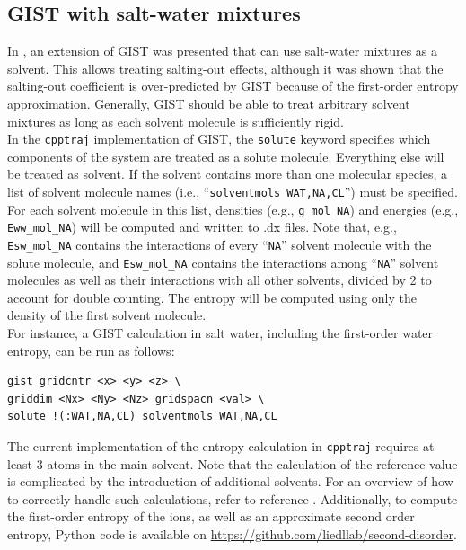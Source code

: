 \documentclass[9pt,tutorial]{livecoms}
\newcommand{\software}{\texttt}
\newcommand\inlinecode{\texttt}
\begin{document}
\subsection{GIST with salt-water mixtures}
\label{sec-salt-water}
In \cite{Waibl2021-gist-salt}, an extension of GIST was presented that can use salt-water mixtures as a solvent.
This allows treating salting-out effects, although it was shown that the salting-out coefficient is over-predicted by GIST because of the first-order entropy approximation.
Generally, GIST should be able to treat arbitrary solvent mixtures as long as each solvent molecule is sufficiently rigid. \\
In the \software{cpptraj} implementation of GIST, the \inlinecode{solute} keyword specifies which components of the system are treated as a solute molecule.
Everything else will be treated as solvent.
If the solvent contains more than one molecular species, a list of solvent molecule names (i.e., ``\inlinecode{solventmols WAT,NA,CL}'') must be specified.
For each solvent molecule in this list, densities (e.g., \inlinecode{g\_mol\_NA}) and energies (e.g., \inlinecode{Eww\_mol\_NA}) will be computed and written to .dx files.
Note that, e.g., \inlinecode{Esw\_mol\_NA} contains the interactions of every ``\inlinecode{NA}'' solvent molecule with the solute molecule, and \inlinecode{Esw\_mol\_NA} contains the interactions among ``\inlinecode{NA}'' solvent molecules as well as their interactions with all other solvents, divided by 2 to account for double counting.
The entropy will be computed using only the density of the first solvent molecule. \\
For instance, a GIST calculation in salt water, including the first-order water entropy, can be run as follows:

\begin{lstlisting}[style=cpptraj]
gist gridcntr <x> <y> <z> \
griddim <Nx> <Ny> <Nz> gridspacn <val> \
solute !(:WAT,NA,CL) solventmols WAT,NA,CL
\end{lstlisting}
The current implementation of the entropy calculation in \software{cpptraj} requires at least 3 atoms in the main solvent.
Note that the calculation of the reference value is complicated by the introduction of additional solvents.
For an overview of how to correctly handle such calculations, refer to reference \cite{Waibl2021-gist-salt}.
Additionally, to compute the first-order entropy of the ions, as well as an approximate second order entropy, Python code is available on \url{https://github.com/liedllab/second-disorder}.
\end{document}
